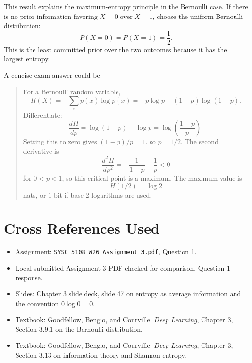 \documentclass[11pt]{article}
\begin{document}
This result explains the maximum-entropy principle in the Bernoulli case. If there is no prior information favoring $X=0$ over $X=1$, choose the uniform Bernoulli distribution:
\[
P(X=0)=P(X=1)=\frac12.
\]
This is the least committed prior over the two outcomes because it has the largest entropy.

A concise exam answer could be:
\begin{quote}
For a Bernoulli random variable,
\[
H(X)=-\sum_xp(x)\log p(x)=-p\log p-(1-p)\log(1-p).
\]
Differentiate:
\[
\frac{dH}{dp}=\log(1-p)-\log p
=\log\left(\frac{1-p}{p}\right).
\]
Setting this to zero gives $(1-p)/p=1$, so $p=1/2$. The second derivative is
\[
\frac{d^2H}{dp^2}
=-\frac{1}{1-p}-\frac{1}{p}<0
\]
for $0<p<1$, so this critical point is a maximum. The maximum value is
\[
H(1/2)=\log 2
\]
nats, or $1$ bit if base-2 logarithms are used.
\end{quote}

\section*{Cross References Used}

\begin{itemize}
\item Assignment: \texttt{SYSC 5108 W26 Assignment 3.pdf}, Question 1.
\item Local submitted Assignment 3 PDF checked for comparison, Question 1 response.
\item Slides: Chapter 3 slide deck, slide 47 on entropy as average information and the convention $0\log0=0$.
\item Textbook: Goodfellow, Bengio, and Courville, \textit{Deep Learning}, Chapter 3, Section 3.9.1 on the Bernoulli distribution.
\item Textbook: Goodfellow, Bengio, and Courville, \textit{Deep Learning}, Chapter 3, Section 3.13 on information theory and Shannon entropy.
\end{itemize}
\end{document}
